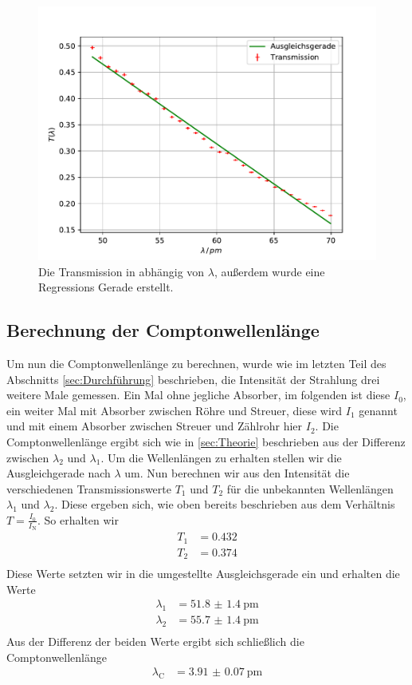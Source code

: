 \begin{figure}
  \centering
  \includegraphics[width=\textwidth]{content/data/Transmission.pdf}
  \caption{Die Transmission in abhängig von $\lambda$, außerdem wurde eine Regressions Gerade erstellt.}
  \label{fig:trans}
\end{figure}

\FloatBarrier
\subsection{Berechnung der Comptonwellenlänge}
Um nun die Comptonwellenlänge zu berechnen, wurde wie im letzten Teil des Abschnitts \ref{sec:Durchführung} beschrieben, die Intensität der Strahlung drei weitere Male gemessen.
Ein Mal ohne jegliche Absorber, im folgenden ist diese $I_0$, ein weiter Mal mit Absorber zwischen Röhre und Streuer, diese wird $I_1$ genannt und mit einem Absorber zwischen Streuer und Zählrohr hier $I_2$.
Die Comptonwellenlänge ergibt sich wie in \ref{sec:Theorie} beschrieben aus der Differenz zwischen $\lambda_2$ und $\lambda_1$.
Um die Wellenlängen zu erhalten stellen wir die Ausgleichgerade nach $\lambda$ um.
Nun berechnen wir aus den Intensität die verschiedenen Transmissionswerte $T_1$ und $T_2$ für die unbekannten Wellenlängen $\lambda_1$ und $\lambda_2$.
Diese ergeben sich, wie oben bereits beschrieben aus dem Verhältnis $T = \frac{I_0}{I_\text{N}}$.
So erhalten wir
\begin{align*}
  T_1 & = 0.432 \\
  T_2 & = 0.374 \\
\end{align*}
Diese Werte setzten wir in die umgestellte Ausgleichsgerade ein und erhalten die Werte
\begin{align*}
  \lambda_1 &= \SI{51.8(14)}{\pico\meter}\\
  \lambda_2 &= \SI{55.7(14)}{\pico\meter}\\
\end{align*}
Aus der Differenz der beiden Werte ergibt sich schließlich die Comptonwellenlänge
\begin{align*}
  \lambda_\text{C} &= \SI{3.91(7)}{\pico\meter}
\end{align*}